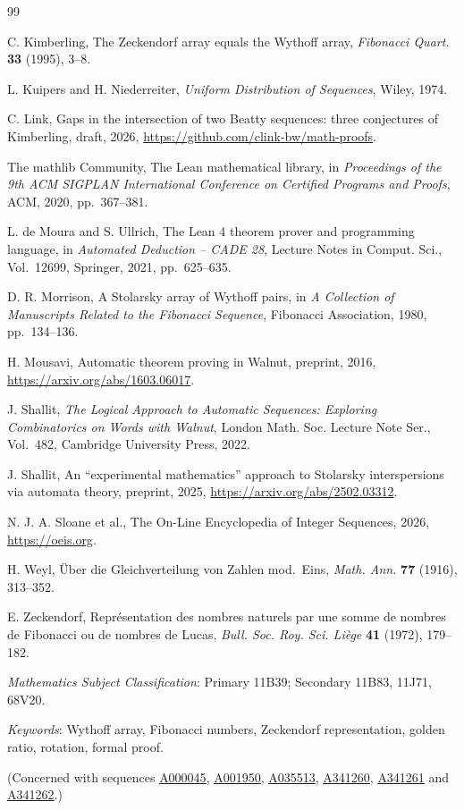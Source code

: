 \documentclass[12pt]{article}
\newcommand{\seqnum}[1]{\href{https://oeis.org/#1}{\underline{#1}}}
\theoremstyle{plain}
\theoremstyle{remark}
\begin{document}
\begin{thebibliography}{99}

C. Kimberling, The Zeckendorf array equals the Wythoff array, \emph{Fibonacci Quart.}
\textbf{33} (1995), 3--8.

L. Kuipers and H. Niederreiter, \emph{Uniform Distribution of Sequences}, Wiley, 1974.

C. Link, Gaps in the intersection of two Beatty sequences: three conjectures of Kimberling,
draft, 2026, \url{https://github.com/clink-bw/math-proofs}.

The mathlib Community, The Lean mathematical library, in \emph{Proceedings of the 9th ACM
SIGPLAN International Conference on Certified Programs and Proofs}, ACM, 2020, pp.~367--381.

L. de Moura and S. Ullrich, The Lean 4 theorem prover and programming language, in
\emph{Automated Deduction -- CADE 28}, Lecture Notes in Comput. Sci., Vol.~12699, Springer,
2021, pp.~625--635.

D. R. Morrison, A Stolarsky array of Wythoff pairs, in \emph{A Collection of Manuscripts Related
to the Fibonacci Sequence}, Fibonacci Association, 1980, pp.~134--136.

H. Mousavi, Automatic theorem proving in Walnut, preprint, 2016,
\url{https://arxiv.org/abs/1603.06017}.

J. Shallit, \emph{The Logical Approach to Automatic Sequences: Exploring Combinatorics on Words
with Walnut}, London Math. Soc. Lecture Note Ser., Vol.~482, Cambridge University Press, 2022.

J. Shallit, An ``experimental mathematics'' approach to Stolarsky interspersions via automata
theory, preprint, 2025, \url{https://arxiv.org/abs/2502.03312}.

N. J. A. Sloane et al., The On-Line Encyclopedia of Integer Sequences, 2026,
\url{https://oeis.org}.

H. Weyl, \"Uber die Gleichverteilung von Zahlen mod.\ Eins, \emph{Math. Ann.} \textbf{77}
(1916), 313--352.

E. Zeckendorf, Repr\'esentation des nombres naturels par une somme de nombres de Fibonacci ou de
nombres de Lucas, \emph{Bull. Soc. Roy. Sci. Li\`ege} \textbf{41} (1972), 179--182.

\end{thebibliography}

\bigskip
{} \emph{Mathematics Subject Classification}: Primary 11B39; Secondary 11B83, 11J71,
68V20.

\noindent \emph{Keywords}: Wythoff array, Fibonacci numbers, Zeckendorf representation, golden
ratio, rotation, formal proof.

\begin{sloppypar}
\noindent (Concerned with sequences \seqnum{A000045}, \seqnum{A001950}, \seqnum{A035513},
\seqnum{A341260}, \seqnum{A341261} and \seqnum{A341262}.)
\end{sloppypar}
\end{document}
